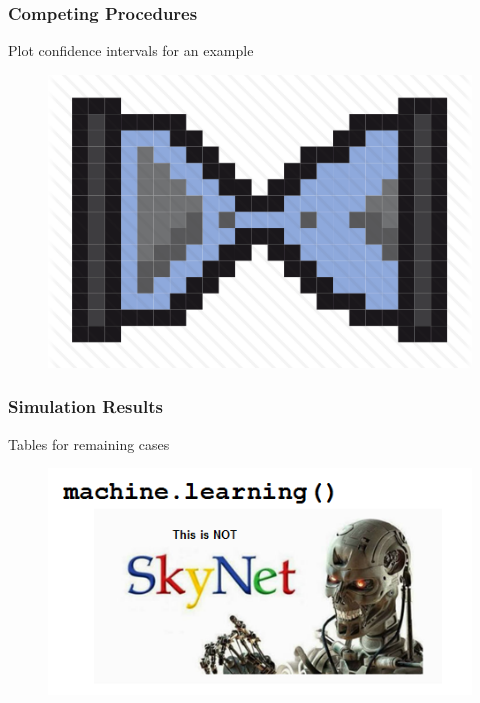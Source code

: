 \documentclass{beamer}
\begin{document}

\begin{frame}
\frametitle{Competing Procedures}

Plot confidence intervals for an example
\begin{figure}
    \includegraphics[scale =  0.5 ]{Figs/hourglass_icon_2.png}
\end{figure}

\end{frame}



\begin{frame}
\frametitle{Simulation Results}

Tables for remaining cases
\begin{figure}
    \includegraphics[scale =  0.75 ]{Figs/ThisIsNotSkyNetLogo.png}
\end{figure}

\end{frame}
\end{document}
